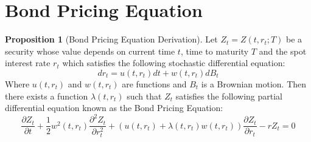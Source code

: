 \documentclass[11pt]{article}
\theoremstyle{definition}
\newtheorem{prop}{Proposition}[section]
\newcommand{\brac}[1]{\left(#1\right)}
\newcommand{\pardiff}[2]{\frac{\partial #1}{\partial #2}}
\begin{document}
\section{Bond Pricing Equation}
	
	\begin{prop}[Bond Pricing Equation Derivation]\label{BPEDeriv}
		Let $Z_t = Z\brac{t,r_t;T}$ be a security whose value depends on current time $t$, time to maturity $T$ and the spot interest rate $r_t$ which satisfies the following stochastic differential equation:
		$$dr_t = u\brac{t,r_t}dt + w\brac{t,r_t}dB_t$$
		Where $u\brac{t,r_t}$ and $w\brac{t,r_t}$ are functions and $B_t$ is a Brownian motion. Then there exists a function $\lambda\brac{t,r_t}$ such that $Z_t$ satisfies the following partial differential equation known as the Bond Pricing Equation:
		\begin{equation}\label{BPE}
			\pardiff{Z_t}{t} + \frac{1}{2}w^2\brac{t,r_t}\pardiff{^2Z_t}{r_t^2} + \brac{u\brac{t,r_t} + \lambda\brac{t,r_t}w\brac{t,r_t}}\pardiff{Z_t}{r_t} - rZ_t = 0
		\end{equation} 
	\end{prop}
\end{document}
